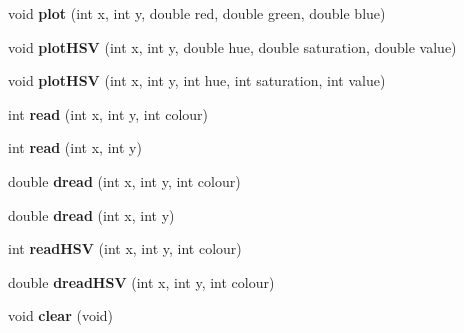 \begin{DoxyCompactItemize}
\item 
\hypertarget{classpngwriter_a138a2c3c7c945a135d2c0398c4f6bdfd}{}void {\bfseries plot} (int x, int y, double red, double green, double blue)\label{classpngwriter_a138a2c3c7c945a135d2c0398c4f6bdfd}

\item 
\hypertarget{classpngwriter_acb03a43f1485f31100c2e7f5d4bebfa1}{}void {\bfseries plot\+H\+S\+V} (int x, int y, double hue, double saturation, double value)\label{classpngwriter_acb03a43f1485f31100c2e7f5d4bebfa1}

\item 
\hypertarget{classpngwriter_a6bc0f8ee1eacb869861da14e85b6f365}{}void {\bfseries plot\+H\+S\+V} (int x, int y, int hue, int saturation, int value)\label{classpngwriter_a6bc0f8ee1eacb869861da14e85b6f365}

\item 
\hypertarget{classpngwriter_aac8923f8582e175beada765448b451fa}{}int {\bfseries read} (int x, int y, int colour)\label{classpngwriter_aac8923f8582e175beada765448b451fa}

\item 
\hypertarget{classpngwriter_a8a7dcb8d7baecfc1bf727e19e7326b1f}{}int {\bfseries read} (int x, int y)\label{classpngwriter_a8a7dcb8d7baecfc1bf727e19e7326b1f}

\item 
\hypertarget{classpngwriter_ad8777d1d584c5b1b9f13a611971a8943}{}double {\bfseries dread} (int x, int y, int colour)\label{classpngwriter_ad8777d1d584c5b1b9f13a611971a8943}

\item 
\hypertarget{classpngwriter_a9e0307d071ed9939b33e49a41fbb8862}{}double {\bfseries dread} (int x, int y)\label{classpngwriter_a9e0307d071ed9939b33e49a41fbb8862}

\item 
\hypertarget{classpngwriter_a0fba7a49307dc84461f5f430a6d7328a}{}int {\bfseries read\+H\+S\+V} (int x, int y, int colour)\label{classpngwriter_a0fba7a49307dc84461f5f430a6d7328a}

\item 
\hypertarget{classpngwriter_a61b26df1b69614757b42d2335218e827}{}double {\bfseries dread\+H\+S\+V} (int x, int y, int colour)\label{classpngwriter_a61b26df1b69614757b42d2335218e827}

\item 
\hypertarget{classpngwriter_aa875fbd3cab6481c6bb8bb7bc8a54329}{}void {\bfseries clear} (void)\label{classpngwriter_aa875fbd3cab6481c6bb8bb7bc8a54329}


\end{DoxyCompactItemize}
